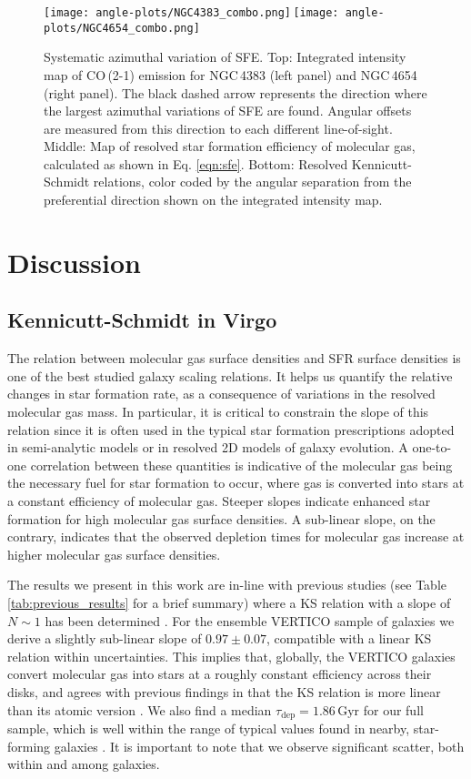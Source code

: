 \documentclass[longauth]{aa}
\begin{document}
\begin{figure*}
\centering
\texttt{[image: angle-plots/NGC4383\_combo.png]}\,\texttt{[image: angle-plots/NGC4654\_combo.png]}
\caption{Systematic azimuthal variation of SFE. Top: Integrated intensity map of CO\,(2-1) emission for NGC\,4383 (left panel) and NGC\,4654 (right panel). The black dashed arrow represents the direction where the largest azimuthal variations of SFE are found. Angular offsets are measured from this direction to each different line-of-sight. Middle: Map of resolved star formation efficiency of molecular gas, calculated as shown in Eq. \ref{eqn:sfe}. Bottom: Resolved Kennicutt-Schmidt relations, color coded by the angular separation from the preferential direction shown on the integrated intensity map.}
\label{fig:angle_az}
\end{figure*}


\section{Discussion}
\label{sec:discussion}
\subsection{Kennicutt-Schmidt in Virgo}
The relation between molecular gas surface densities and SFR surface densities is one of the best studied galaxy scaling relations. It helps us quantify the relative changes in star formation rate, as a consequence of variations in the resolved molecular gas mass. In particular, it is critical to constrain the slope of this relation since it is often used in the typical star formation prescriptions adopted in semi-analytic models or in resolved 2D models of galaxy evolution. A one-to-one correlation between these quantities is indicative of the molecular gas being the necessary fuel for star formation to occur, where gas is converted into stars at a constant efficiency of molecular gas. Steeper slopes indicate enhanced star formation for high molecular gas surface densities. A sub-linear slope, on the contrary, indicates that the observed depletion times for molecular gas increase at higher molecular gas surface densities.

The results we present in this work are in-line with previous studies (see Table \ref{tab:previous_results} for a brief summary) where a KS relation with a slope of $N\sim1$ has been determined \citep[e.g.,][]{Bigiel2008,Schruba2011,Leroy2013,Usero2015,Ellison2021}. For the ensemble VERTICO sample of galaxies we derive a slightly sub-linear slope of $0.97\pm0.07$, compatible with a linear KS relation within uncertainties. This implies that, globally, the VERTICO galaxies convert molecular gas into stars at a roughly constant efficiency across their disks, and agrees with previous findings in that the KS relation is more linear than its atomic version \citep{Bigiel2008,Leroy2013}. We also find a median $\tau_{\mathrm{dep}}=1.86\,\mathrm{Gyr}$ for our full sample, which is well within the range of typical values found in nearby, star-forming galaxies \citep[$\sim 1-3\,\mathrm{Gyr}$, see][]{Bigiel2008,Leroy2008,Leroy2013,Rahman2012,Querejeta2021}. It is important to note that we observe significant scatter, both within and among galaxies. 
\end{document}
